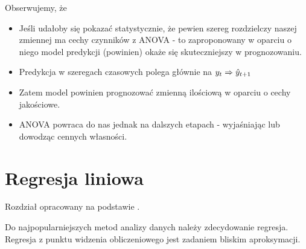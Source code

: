 \documentclass[10pt,a4paper]{book}
\begin{document}
Obserwujemy, że
\begin{itemize}
\item Jeśli udałoby się pokazać statystycznie, że pewien szereg rozdzielczy naszej zmiennej ma cechy czynników z ANOVA - to zaproponowany w oparciu o niego model predykcji (powinien) okaże się skuteczniejszy w prognozowaniu.
\item Predykcja w szeregach czasowych polega głównie na $y_t \Rightarrow \predict{y}{t+1}$
\item Zatem model powinien prognozować zmienną ilościową w oparciu o cechy jakościowe.
\item ANOVA powraca do nas jednak na dalszych etapach - wyjaśniając lub dowodząc cennych własności.
\end{itemize}

\section{Regresja liniowa}

Rozdział opracowany na podstawie \cite{montgomery2015introduction}.

Do najpopularniejszych metod analizy danych należy zdecydowanie regresja. Regresja z punktu widzenia obliczeniowego jest zadaniem bliskim aproksymacji.
\end{document}
